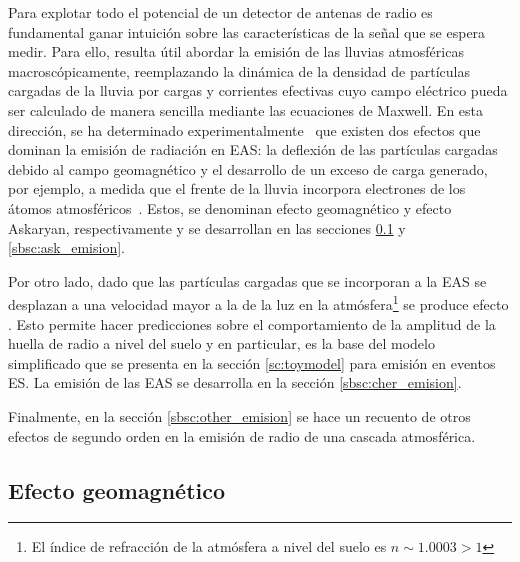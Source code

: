 Para explotar todo el potencial de un detector de antenas de radio es fundamental ganar intuici\'on sobre las caracter\'isticas de la se\~nal que se espera medir.
Para ello, resulta \'util abordar la emisi\'on de las lluvias atmosf\'ericas macrosc\'opicamente, reemplazando la din\'amica de la densidad de part\'iculas cargadas de la lluvia por cargas y corrientes efectivas cuyo campo el\'ectrico pueda ser calculado de manera sencilla mediante las ecuaciones de Maxwell.
En esta direcci\'on, se ha determinado experimentalmente~\cite{ardouin2005radio,huege2012lopes,horandel2009lofar,schroder2013tunka,kelley2011aera,} que existen dos efectos que dominan la emisi\'on de radiaci\'on en EAS: la deflexi\'on de las part\'iculas cargadas debido al campo geomagn\'etico y el desarrollo de un exceso de carga generado, por ejemplo, a medida que el frente de la lluvia incorpora electrones de los \'atomos atmosf\'ericos~\cite{scholten:2008}.
Estos, se denominan efecto geomagn\'etico y efecto Askaryan, respectivamente y se desarrollan en las secciones \ref{sbsc:geom_emision} y \ref{sbsc:ask_emision}.

Por otro lado, dado que las part\'iculas cargadas que se incorporan a la EAS se desplazan a una velocidad mayor a la de la luz en la atm\'osfera\footnote{El \'indice de refracci\'on de la atm\'osfera a nivel del suelo es $n\sim1.0003>1$} se produce efecto \cher{}.
Esto permite hacer predicciones sobre el comportamiento de la amplitud de la huella de radio a nivel del suelo y en particular, es la base del modelo simplificado que se presenta en la secci\'on \ref{sc:toymodel} para emisi\'on en eventos ES. 
La emisi\'on \cher{} de las EAS se desarrolla en la secci\'on \ref{sbsc:cher_emision}.

Finalmente, en la secci\'on \ref{sbsc:other_emision} se hace un recuento de otros efectos de segundo orden en la emisi\'on de radio de una cascada atmosf\'erica.

\subsection{Efecto geomagn\'etico}
\label{sbsc:geom_emision}
	
